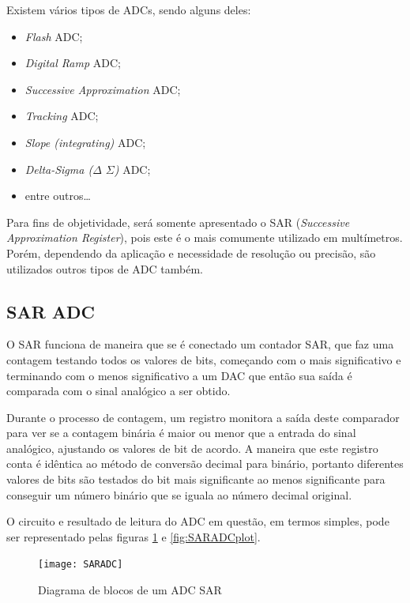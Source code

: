 Existem vários tipos de \gls{ADC}s, sendo alguns deles:

\begin{itemize}
    \item \textit{Flash} \gls{ADC};
    \item \textit{Digital Ramp} \gls{ADC};
    \item \textit{Successive Approximation} \gls{ADC};
    \item \textit{Tracking} \gls{ADC};
    \item \textit{Slope (integrating)} \gls{ADC};
    \item \textit{Delta-Sigma ($\Delta$ $\Sigma$)} \gls{ADC};
    \item entre outros\dots
\end{itemize}

Para fins de objetividade, será somente apresentado o \gls{SAR} (\textit{Successive Approximation Register}), pois este é o mais comumente utilizado em multímetros. Porém, dependendo da aplicação e necessidade de resolução ou precisão, são utilizados outros tipos de \gls{ADC} também.

    \subsection{SAR ADC}\label{SARADC}
    O \gls{SAR} funciona de maneira que se é conectado um contador \gls{SAR}, que faz uma contagem testando todos os valores de bits, começando com o mais significativo e terminando com o menos significativo a um \gls{DAC} que então sua saída é comparada com o sinal analógico a ser obtido. 
    
    Durante o processo de contagem, um registro monitora a saída deste comparador para ver se a contagem binária é maior ou menor que a entrada do sinal analógico, ajustando os valores de bit de acordo. A maneira que este registro conta é idêntica ao método de conversão decimal para binário, portanto diferentes valores de bits são testados do bit mais significante ao menos significante para conseguir um número binário que se iguala ao número decimal original. 

    O circuito e resultado de leitura do \gls{ADC} em questão, em termos simples, pode ser representado pelas figuras \ref{fig:SARADC} e \ref{fig:SARADCplot}.
    \begin{figure}[htb]%
        \caption{Diagrama de blocos de um ADC SAR}%
        \label{fig:SARADC}%
        \texttt{[image: SARADC]}%
    \end{figure}  

